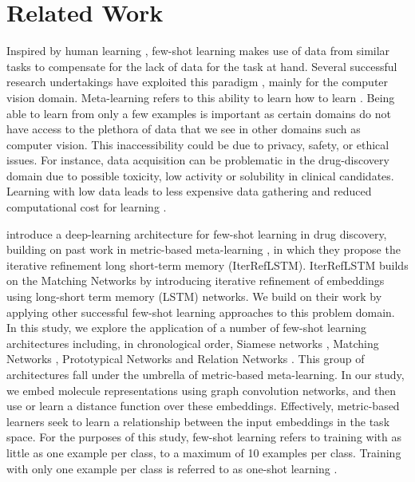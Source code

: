 \section{Related Work}

Inspired by human learning \cite{lake2015human}, few-shot learning makes use of data from similar tasks to compensate for the lack of data for the task at hand. Several successful research undertakings have exploited this paradigm \cite{koch2015siamese, vinyals2016matching, snell2017prototypical, sung2018learning}, mainly for the computer vision domain. Meta-learning refers to this ability to learn how to learn \cite{thrun2012learning, finn2017model}. Being able to learn from only a few examples is important as certain domains do not have access to the plethora of data that we see in other domains such as computer vision. This inaccessibility could be due to privacy, safety, or ethical issues. For instance, data acquisition can be problematic in the drug-discovery domain due to possible toxicity, low activity or solubility in clinical candidates. Learning with low data leads to less expensive data gathering and reduced computational cost for learning \cite{wang2020generalizing}.

\citet{altae2017low} introduce a deep-learning architecture for few-shot learning in drug discovery, building on past work in metric-based meta-learning \cite{vinyals2016matching}, in which they propose the iterative refinement long short-term memory (IterRefLSTM). IterRefLSTM builds on the Matching Networks \cite{vinyals2016matching} by introducing iterative refinement of embeddings using long-short term memory (LSTM) networks. We build on their work by applying other successful few-shot learning approaches to this problem domain. In this study, we explore the application of a number of few-shot learning architectures including, in chronological order, Siamese networks \citep{koch2015siamese}, Matching Networks \citep{vinyals2016matching}, Prototypical Networks \citep{snell2017prototypical} and Relation Networks \citep{sung2018learning}. This group of architectures fall under the umbrella of metric-based meta-learning. In our study, we embed molecule representations using graph convolution networks, and then use or learn a distance function over these embeddings. Effectively, metric-based learners seek to learn a relationship between the input embeddings in the task space. For the purposes of this study, few-shot learning refers to training with as little as one example per class, to a maximum of 10 examples per class. Training with only one example per class is referred to as one-shot learning \citep{koch2015siamese, vinyals2016matching}.

